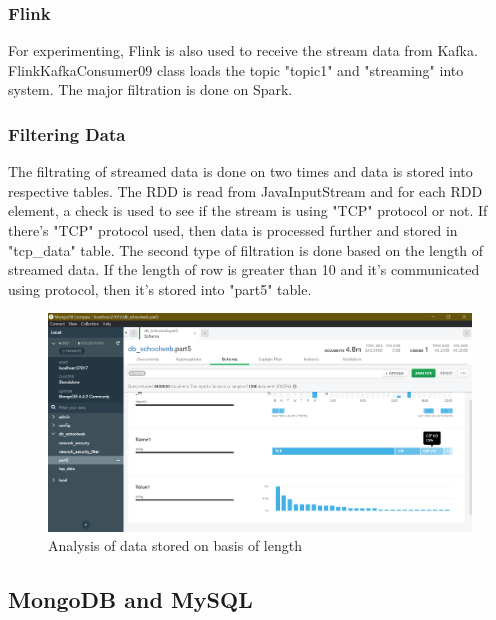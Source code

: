 \documentclass{article}
\begin{document}
\subsubsection{Flink}
For experimenting, Flink is also used to receive the stream data from Kafka. FlinkKafkaConsumer09 class loads the topic "topic1" and "streaming" into system. The major filtration is done on Spark.
\subsubsection{Filtering Data}
The filtrating of streamed data is done on two times and data is stored into respective tables. The RDD is read from JavaInputStream and for each RDD element, a check is used to see if the stream is using "TCP" protocol or not. If there's "TCP" protocol used, then data is processed further and stored in "tcp\_data" table.
The second type of filtration is done based on the length of streamed data. If the length of row is greater than 10 and it's communicated using protocol, then it's stored into "part5" table.

\begin{figure}[h!]
\centering
\includegraphics[scale=0.35]{part5_analysis_mongodb.png}
\caption{Analysis of data stored on basis of length}
\label{fig:universe}
\end{figure}

\subsection{MongoDB and MySQL}
\end{document}
